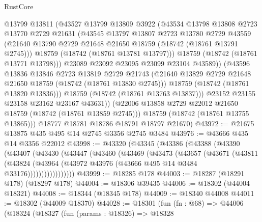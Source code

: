 \begin{lexlean}{RustCore}
\begin{coremodule}
                @13799
                @13811
                (@43527
                  @13799
                  @13809
                  @3922
                  (@43534
                    @13798
                    @13808
                    @2723
                    @13770
                    @2729
                    @21631
                    (@43545
                      @13797
                      @13807
                      @2723
                      @13780
                      @2729
                      @43559
                      (@21640 @13790 @2729 @21648 @21650 @18759 (@18742 (@18761 @13791 @2745)))
                      @18759
                      (@18742 (@18761 @13781 @13797)))
                    @18759
                    (@18742 (@18761 @13771 @13798)))
                  @23089
                  @23092
                  @23095
                  @23099
                  @23104
                  @43589))
              (@43596
                @13836
                @13846
                @2723
                @13819
                @2729
                @21743
                (@21640 @13829 @2729 @21648 @21650 @18759 (@18742 (@18761 @13830 @2745)))
                @18759
                (@18742 (@18761 @13820 @13836)))
              @18759
              (@18742 (@18761 @13763 @13837)))
            @23152
            @23155
            @23158
            @23162
            @23167
            @43631))
        (@22006 @13858 @2729 @22012 @21650 @18759 (@18742 (@18761 @13859 @2745)))
        @18759
        (@18742 (@18761 @13755 @13865)))
      @18777
      @18781
      @18786
      @18791
      @18797
      @21670)
@43972 := @21675 @13875 @435 @495 @14 @2745 @3356 @2745 @3484
@43976 := @43666 @435 @14 @3356 @22012
@43998 := @43320
    (@43345
      (@43386
        (@43388
          (@43390
            (@43407
              (@43430
                (@43447
                  (@43460
                    (@43469
                      (@43473
                        (@43657
                          (@43671
                            (@43811
                              (@43824
                                (@43964
                                  (@43972 @43976 (@43666 @495 @14 @3484 @33176)))))))))))))))))
@43999 := @18285 @178
@44003 := @18287 (@18291 @178) (@18297 @178)
@44004 := @18306 @39435
@44006 := @18302 (@44004 @18321)
@44008 := @18344 (@18345 @178)
@44009 := @18340 @44008
@44011 := @18302 (@44009 @18370)
@44028 := @18301
    (fun (fn : @68) =>
    @44006
      (@18324
        (@18327
          (fun (params : @18326) =>
          @18328

\end{coremodule}
\end{lexlean}
